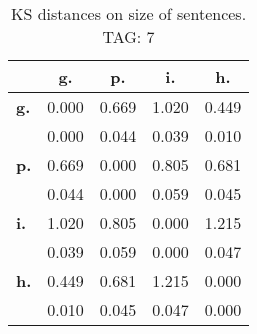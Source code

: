 \begin{table}[h!]
\begin{center}
\begin{tabular}{| l || c | c | c | c |}\hline
 & {\bf g.} & {\bf p.} & {\bf i.} & {\bf h.} \\\hline\hline
{\bf g.} & 0.000 & 0.669 & 1.020 & 0.449 \\
{\bf } & 0.000 & 0.044 & 0.039 & 0.010 \\\hline
{\bf p.} & 0.669 & 0.000 & 0.805 & 0.681 \\
{\bf } & 0.044 & 0.000 & 0.059 & 0.045 \\\hline
{\bf i.} & 1.020 & 0.805 & 0.000 & 1.215 \\
{\bf } & 0.039 & 0.059 & 0.000 & 0.047 \\\hline
{\bf h.} & 0.449 & 0.681 & 1.215 & 0.000 \\
{\bf } & 0.010 & 0.045 & 0.047 & 0.000 \\\hline
\end{tabular}
\caption{KS distances on size of sentences. TAG: 7}
\end{center}
\end{table}